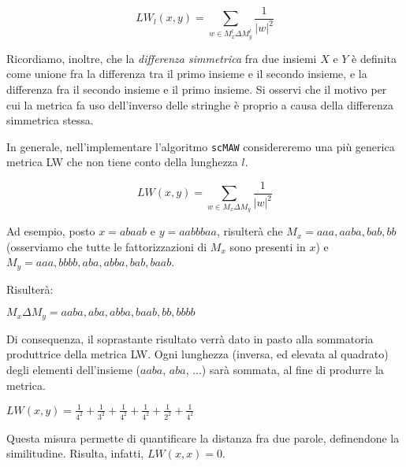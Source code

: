 \[LW_l (x, y)=\sum_{w \in M^l_x \Delta M^l_y} \frac{1}{|w|^2 }\]

\vspace{3mm}

Ricordiamo, inoltre, che la \textit{differenza simmetrica} fra due insiemi $X$ e $Y$ è definita come unione fra la differenza tra il primo insieme e il secondo insieme, e la differenza fra il secondo insieme e il primo insieme. Si osservi che il motivo per cui la metrica fa uso dell'inverso delle stringhe è proprio a causa della differenza simmetrica stessa.

\vspace{3mm}

In generale, nell'implementare l'algoritmo \verb|scMAW| considereremo una più generica metrica LW che non tiene conto della lunghezza $l$.

\[LW (x, y)=\sum_{w \in M_x \Delta M_y} \frac{1}{|w|^2 }\]

Ad esempio, posto $x=abaab$ e $y=aabbbaa$, risulterà che $M_x=aaa, aaba, bab, bb$ (osserviamo che tutte le fattorizzazioni di $M_x$ sono presenti in $x$) e $M_y=aaa,bbbb,aba,abba,bab,baab$.

\vspace{3mm}

Risulterà:

\vspace{3mm}

\(M_x \Delta M_y ={aaba,aba,abba,baab,bb,bbbb}\)

\vspace{3mm}

Di consequenza, il soprastante risultato verrà dato in pasto alla sommatoria produttrice della metrica LW. Ogni lunghezza (inversa, ed elevata al quadrato) degli elementi dell'insieme ($aaba$, $aba$, ...) sarà sommata, al fine di produrre la metrica.

\(LW(x,y) = \frac{1}{4^2}+\frac{1}{3^2}+\frac{1}{4^2}+\frac{1}{4^2}+\frac{1}{2^2}+\frac{1}{4^2}\)

Questa misura permette di quantificare la distanza fra due parole, definendone la similitudine. Risulta, infatti, $LW(x,x)=0$. 